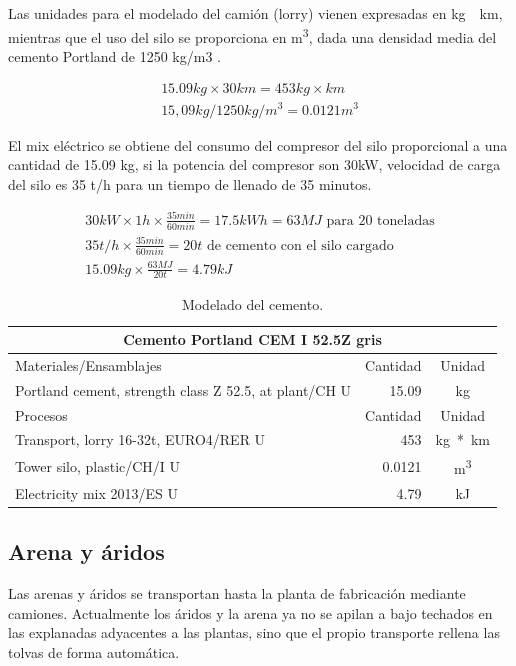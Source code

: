Las unidades para el modelado del camión (lorry) vienen expresadas en \si{kg\times km}, mientras que el uso del silo se proporciona en \si{m^3}, dada una densidad media del cemento Portland de 1250 \si{kg/m3} \cite{website:ecoinvent}.

\begin{gather}
15.09 kg \times 30 km = 453 kg\times km\\
15,09 kg / 1250 kg/m^3 = 0.0121 m^3
\end{gather}

El mix eléctrico se obtiene del consumo del compresor del silo proporcional a una cantidad de 15.09 \si{kg}, si la potencia del compresor son 30kW, velocidad de carga del silo es 35 \si{\tonne/h} para un tiempo de llenado de 35 minutos.

\begin{gather}
30 kW \times 1 h \times \frac{35 min}{60 min} = 17.5 kWh = 63 MJ \text{ para 20 toneladas}\\
35 t/h \times \frac{35 min}{60 min} = 20 t \text{ de cemento con el silo cargado}\\
15.09 kg \times \frac{63 MJ}{20 t} = 4.79 kJ
\end{gather}

\begin{table}[!htb]
\centering
\begin{tabular}{p{8cm}rc}
\toprule
\multicolumn{3}{c}{Cemento Portland CEM I 52.5Z gris}\\
\midrule
Materiales/Ensamblajes & Cantidad & Unidad\\
\midrule
Portland cement, strength class Z 52.5, at plant/CH U & 15.09 & \si{kg}\\
\midrule
Procesos & Cantidad & Unidad\\
\midrule
Transport, lorry 16-32t, EURO4/RER U & 453 & \si{kg*km}\\
Tower silo, plastic/CH/I U & 0.0121 & \si{m^3}\\
Electricity mix 2013/ES U & 4.79 & \si{kJ}\\
\bottomrule
\end{tabular}
\caption{Modelado del cemento.}
\label{modeladodelcemento}
\end{table}

\subsection{Arena y áridos}
Las arenas y áridos se transportan hasta la planta de fabricación mediante camiones. Actualmente los áridos y la arena ya no se apilan a bajo techados en las explanadas adyacentes a las plantas, sino que el propio transporte rellena las tolvas de forma automática.

